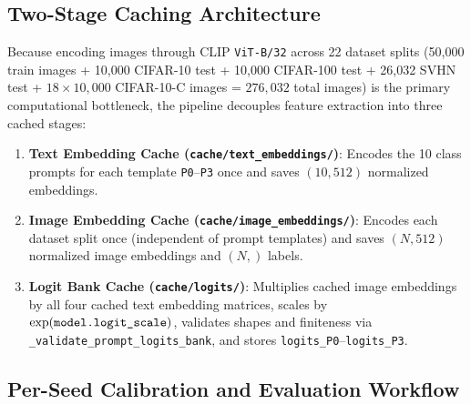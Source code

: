 \documentclass[11pt,a4paper]{article}
\begin{document}
\subsection{Two-Stage Caching Architecture}

Because encoding images through CLIP \texttt{ViT-B/\allowbreak{}32} across 22 dataset splits (50,000 train images + 10,000 CIFAR-10 test + 10,000 CIFAR-100 test + 26,032 SVHN test + $18 \times 10,000$ CIFAR-10-C images = $276,032$ total images) is the primary computational bottleneck, the pipeline decouples feature extraction into three cached stages:
\begin{enumerate}
  \item \textbf{Text Embedding Cache (\texttt{cache/\allowbreak{}text\_\allowbreak{}embeddings/\allowbreak{}})}: Encodes the 10 class prompts for each template \texttt{P0}--\texttt{P3} once and saves $(10, 512)$ normalized embeddings.
  \item \textbf{Image Embedding Cache (\texttt{cache/\allowbreak{}image\_\allowbreak{}embeddings/\allowbreak{}})}: Encodes each dataset split once (independent of prompt templates) and saves $(N, 512)$ normalized image embeddings and $(N,)$ labels.
  \item \textbf{Logit Bank Cache (\texttt{cache/\allowbreak{}logits/\allowbreak{}})}: Multiplies cached image embeddings by all four cached text embedding matrices, scales by $\exp(\texttt{model.\allowbreak{}logit\_\allowbreak{}scale})$, validates shapes and finiteness via \texttt{\_\allowbreak{}validate\_\allowbreak{}prompt\_\allowbreak{}logits\_\allowbreak{}bank}, and stores \texttt{logits\_\allowbreak{}P0}--\texttt{logits\_\allowbreak{}P3}.
\end{enumerate}

\subsection{Per-Seed Calibration and Evaluation Workflow}
\end{document}
